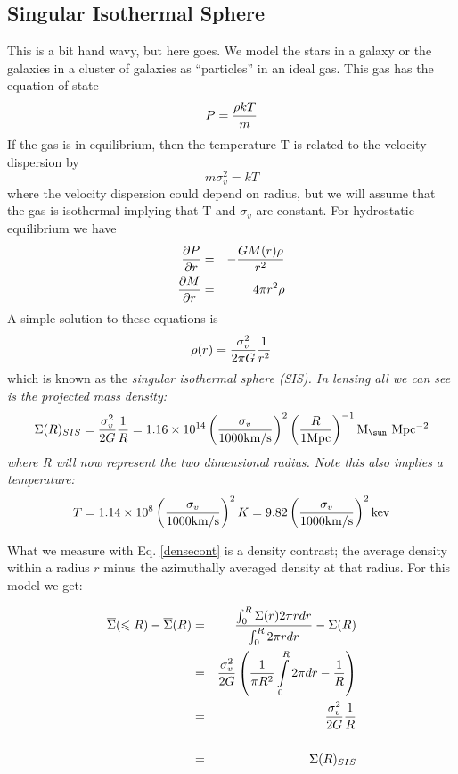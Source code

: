 \documentclass[preprint]{aastex}
\begin{document}
\subsection{Singular Isothermal Sphere} \label{SIS}
This is a bit hand wavy, but here goes.  We model the stars in a galaxy
or the galaxies in a cluster of galaxies as ``particles'' in an ideal gas.
This gas has the equation of state
\begin{equation}\label{siseqofstate}
P = {{\rho kT} \over m }
\end{equation}
If the gas is in equilibrium, then the temperature T is related to the velocity
dispersion by
\begin{equation}
m\sigma_v^2 = kT
\end{equation}
where the velocity dispersion could depend on radius, but we will assume that
the gas is isothermal implying that T and $\sigma_v$ are constant.
For hydrostatic equilibrium we have
\begin{eqnarray}
{ {\partial P} \over {\partial r} } & = & -{ {G M(r)\rho } \over r^2 } \\
{ {\partial M} \over {\partial r} } & = & 4 \pi r^2 \rho
\end{eqnarray}
A simple solution to these equations is 
\begin{equation}
\rho(r) = { \sigma_v^2 \over {2 \pi G} } {1 \over r^2}
\end{equation}
which is known as the \it{singular isothermal sphere} \normalfont(SIS).  In
lensing all we can see is the projected mass density:
\begin{equation}
\Sigma(R)_{SIS} = { \sigma_v^2 \over 2 G } {1 \over R} = 1.16\times10^{14}\left( \sigma_v
\over 1000 \textrm{km/s} \right)^2 \left(R \over 1\textrm{Mpc}\right)^{-1}
\textrm{M$_{\sun}$ Mpc$^{-2}$} 
\end{equation}
where R will now represent the two dimensional radius. Note this also implies a
temperature:
\begin{equation}
T = 1.14\times10^8 \left( \sigma_v \over 1000 \textrm{km/s} \right)^2 K
= 9.82 \left( \sigma_v \over 1000 \textrm{km/s} \right)^2 \textrm{kev}
\end{equation} 

What we measure with Eq. \ref{densecont} is a density contrast; the average
density within a radius $r$ minus the azimuthally averaged density at that
radius. For this model we get:

\begin{eqnarray}
\overline{\Sigma}(\leqslant R) - \overline{\Sigma}(R) & = & 
  { { \intop_0^R \Sigma(r) 2 \pi r dr } \over 
  { \intop_0^R 2 \pi r dr} } - \Sigma(R) \\ \nonumber
 & = & { \sigma_v^2 \over {2 G} } \left( {1 \over \pi R^2 } \intop_0^R 
          2 \pi dr - {1 \over R} \right)  \\ \nonumber
 & = & {\sigma_v^2 \over {2 G}} {1 \over R} \\ \nonumber
    \\
 & = & \Sigma(R)_{SIS} \nonumber
\end{eqnarray}
\end{document}
